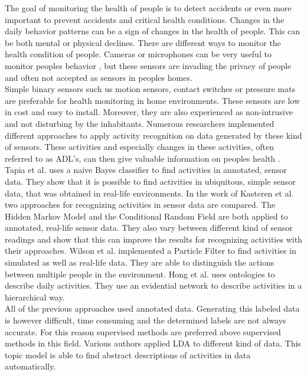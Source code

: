 The goal of monitoring the health of people is to detect accidents or even more important to prevent accidents and critical health conditions. Changes in the daily behavior patterns can be a sign of changes in the health of people. This can be both mental or physical declines.
There are different ways to monitor the health condition of people. Cameras or microphones can be very useful to monitor peoples behavior \cite{Nagai2010204, Wu_2003_4676}, but these sensors are invading the privacy of people and often not accepted as sensors in peoples homes.\\

Simple binary sensors such us motion sensors, contact switches or pressure mats are preferable for health monitoring in home environments. These sensors are low in cost and easy to install. Moreover, they are also experienced as non-intrusive and not disturbing by the inhabitants. Numerous researchers implemented different approaches to apply activity recognition on data generated by these kind of sensors. These activities and especially changes in these activities, often referred to as ADL's, can then give valuable information on peoples health \cite{journals/hf/RogersMWF98}.
Tapia et al. \cite{Tapia04activityrecognition} uses a naive Bayes classifier to find activities in annotated, sensor data. They show that it is possible to find activities in ubiquitous, simple sensor data, that was obtained in real-life environments.
In the work of Kasteren et al. \cite{vanKasteren:2008:AAR:1409635.1409637} two approaches for recognizing activities in sensor data are compared. The Hidden Markov Model and the Conditional Random Field are both applied to annotated, real-life sensor data. They also vary between different kind of sensor readings and show that this can improve the results for recognizing activities with their approaches.
Wilson et al. \cite{Wilson:2005:STA:2154273.2154280} implemented a Particle Filter to find activities in simulated as well as real-life data. They are able to distinguish the actions between multiple people in the environment.
Hong et al. \cite{Hong2009236} uses ontologies to describe daily activities. They use an evidential network to describe activities in a hierarchical way.
\\


All of the previous approaches used annotated data. Generating this labeled data is however difficult, time consuming and the determined labels are not always accurate. For this reason supervised methods are preferred above supervised methods in this field.
Various authors applied LDA to different kind of data. This topic model is able to find abstract descriptions of activities in data automatically.\\

